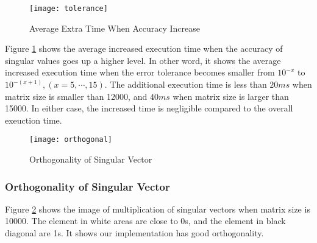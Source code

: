 \begin{figure}[htbp]
\vspace{-0.1in}
\centering
\texttt{[image: tolerance]}
\vspace{-0.1in}
\caption{Average Extra Time When Accuracy Increase}
\label{fig:tolerance}
\vspace{-0.1in}
\end{figure}
Figure \ref{fig:tolerance} shows the average increased execution time when the accuracy of singular values goes up a higher level.
In other word, it shows the average increased execution time when the error tolerance becomes smaller from $10^{-x}$ to $10^{-(x+1)}, (x=5,\cdots,15)$.
The additional execution time is less than $20 ms$ when matrix size is smaller than 12000, and $40 ms$ when matrix size is larger than 15000.
In either case, the increased time is negligible compared to the overall exeuction time.

\begin{figure}[hbpt]
\vspace{-0.1in}
\centering
\texttt{[image: orthogonal]}
\vspace{-0.1in}
\caption{Orthogonality of Singular Vector}
\label{fig:ortho_img}
\vspace{-0.1in}
\end{figure}
\subsubsection{Orthogonality of Singular Vector}
Figure \ref{fig:ortho_img} shows the image of multiplication of singular vectors when matrix size is 10000.
The element in white areas are close to 0s, and the element in black diagonal are 1s.
It shows our implementation has good orthogonality.

